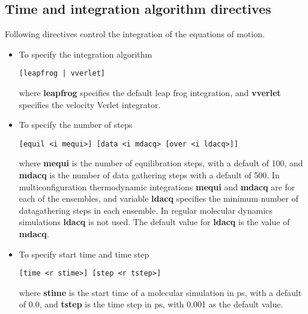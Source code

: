 \subsection{Time and integration algorithm directives}
Following directives control the integration of the equations of motion.
\begin{itemize}
\item
To specify the integration algorithm
\begin{verbatim}
[leapfrog | vverlet]
\end{verbatim}
where {\bf leapfrog} specifies the default leap frog integration, and
{\bf vverlet} specifies the velocity Verlet integrator.
\item
To specify the number of steps
\begin{verbatim}
[equil <i mequi>] [data <i mdacq> [over <i ldacq>]]
\end{verbatim}
where {\bf mequi} is the number of equilibration steps, with a default
of 100, and {\bf mdacq} is the number of data gathering steps with a
default of 500. In multiconfiguration thermodynamic integrations
{\bf mequi} and {\bf mdacq} are for each of the ensembles, and
variable {\bf ldacq} specifies the minimum number of datagathering steps 
in each ensemble. In regular molecular dynamics simulations {\bf ldacq}
is not used. The default value for {\bf ldacq} is the value of {\bf mdacq}.
\item
To specify start time and time step
\begin{verbatim}
[time <r stime>] [step <r tstep>]
\end{verbatim}
where {\bf stime} is the start time of a molecular simulation in ps,
with a default of 0.0, and {\bf tstep} is the time step in ps, with
0.001 as the default value.
\end{itemize}
